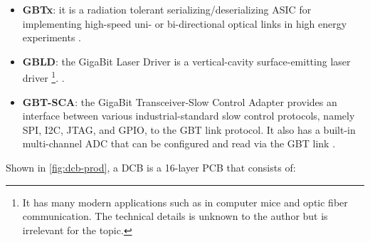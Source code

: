 \begin{itemize}
    \item \textbf{GBTx}:
        it is a radiation tolerant serializing/deserializing ASIC for
        implementing high-speed uni- or bi-directional optical links in high
        energy experiments
        \cite{gbtx_manual}.

    \item \textbf{GBLD}:
        the GigaBit Laser Driver is a
        vertical-cavity surface-emitting laser driver
        \footnote{
            It has many modern applications such as in computer mice and optic
            fiber communication.
            The technical details is unknown to the author but is irrelevant
            for the topic.
        }.
        \cite{gbld_manual}.

    \item \textbf{GBT-SCA}:
        the GigaBit Transceiver-Slow Control Adapter provides an interface
        between various industrial-standard slow control protocols,
        namely SPI, I2C, JTAG, and GPIO, to the GBT link protocol.
        It also has a built-in multi-channel ADC that can be configured and
        read via the GBT link \cite{sca_manual}.
\end{itemize}

Shown in \cref{fig:dcb-prod}, a DCB is a 16-layer PCB that consists of:
\label{dcb-layout}

